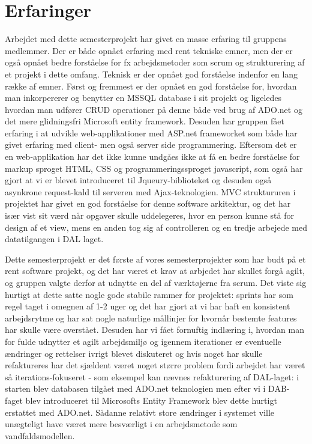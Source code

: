 \section{Erfaringer}
Arbejdet med dette semesterprojekt har givet en masse erfaring til gruppens medlemmer. Der er både opnået erfaring med rent tekniske emner, men der er også opnået bedre forståelse for fx arbejdsmetoder som scrum og strukturering af et projekt i dette omfang.
Teknisk er der opnået god forståelse indenfor en lang række af emner. Først og fremmest er der opnået en god forståelse for, hvordan man inkorpererer og benytter en MSSQL database i sit projekt og ligeledes hvordan man udfører CRUD operationer på denne både ved brug af ADO.net og det mere glidningsfri Microsoft entity framework. Desuden har gruppen fået erfaring i at udvikle web-applikationer med ASP.net frameworket som både har givet erfaring med client- men også server side programmering. Eftersom det er en web-applikation har det ikke kunne undgåes ikke at få en bedre forståelse for markup sproget HTML, CSS og programmeringssproget javascript, som også har gjort at vi er blevet introduceret til Jqueury-biblioteket og desuden også asynkrone request-kald til serveren med Ajax-teknologien.
MVC struktururen i projektet har givet en god forståelse for denne software arkitektur, og det har især vist sit værd når opgaver skulle uddelegeres, hvor en person kunne stå for design af et view, mens en anden tog sig af controlleren og en tredje arbejede med datatilgangen i DAL laget. 

Dette semesterprojekt er det første af vores semesterprojekter som har budt på et rent software projekt, og det har været et krav at arbjedet har skullet forgå agilt, og gruppen valgte derfor at udnytte en del af værktøjerne fra scrum. Det viste sig hurtigt at dette satte nogle gode stabile rammer for projektet: sprints har som regel taget i omegnen af 1-2 uger og det har gjort at vi har haft en konsistent arbejdsrytme og har sat nogle naturlige mållinjer for hvornår bestemte features har skulle være overstået. Desuden har vi fået fornuftig indlæring i, hvordan man for fulde udnytter et agilt arbejdsmiljø og igennem iterationer er eventuelle ændringer og rettelser ivrigt blevet diskuteret og hvis noget har skulle refaktureres har det sjældent været noget større problem fordi arbejdet har været så iterations-fokuseret - som eksempel kan nævnes refakturering af DAL-laget: i starten blev databasen tilgået med ADO.net teknologien men efter vi i DAB-faget blev introduceret til Microsofts Entity Framework blev dette hurtigt erstattet med ADO.net. Sådanne relativt store ændringer i systemet ville unægteligt have været mere besværligt i en arbejdsmetode som vandfaldsmodellen. 

